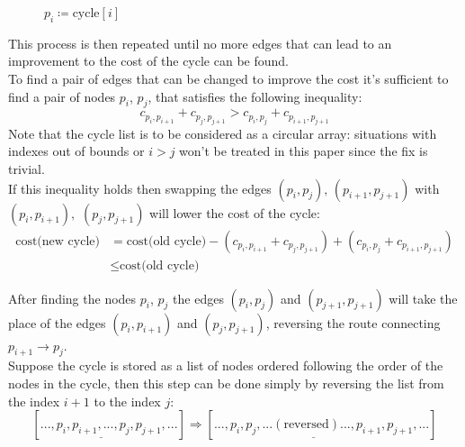 \begin{figure}[h]
\begin{subfigure}[c]{.4\textwidth}
{
        }
    \end{subfigure}
    \caption*{$p_i\coloneq\mbox{cycle}[i]$}

\end{figure}

This process is then repeated until no more edges that can lead to an improvement to the cost of the cycle can be found.\\
To find a pair of edges that can be changed to improve the cost it's sufficient to find a pair of nodes $p_i$, $p_j$, that satisfies the following inequality:
$$c_{p_i,p_{i+1}}+c_{p_j,p_{j+1}} > c_{p_i,p_{j}}+c_{p_{i+1},p_{j+1}}$$
Note that the cycle list is to be considered as a circular array: situations with indexes out of bounds or $i>j$ won't be treated in this paper since the fix is trivial.\\

If this inequality holds then swapping the edges $(p_i,p_j),\,(p_{i+1},p_{j+1})$ with $(p_i,p_{i+1}),$ $(p_{j},p_{j+1})$ will lower the cost of the cycle:
\begin{align*}
    \mbox{cost(new cycle)}&=\mbox{cost(old cycle)}-(c_{p_i,p_{i+1}}+c_{p_j,p_{j+1}})+(c_{p_i,p_{j}}+c_{p_{i+1},p_{j+1}})\\
    &\leq\mbox{cost(old cycle)}
\end{align*}

After finding the nodes $p_i$, $p_j$ the edges $(p_i, p_j)$ and $(p_{j+1}, p_{j+1})$ will take the place of the edges $(p_i, p_{i+1})$ and $(p_j, p_{j+1})$, reversing the route connecting $p_{i+1}\rightarrow p_{j}$.\\
Suppose the cycle is stored as a list of nodes ordered following the order of the nodes in the cycle, then this step can be done simply by reversing the list from the index $i+1$ to the index $j$:
$$[...,p_i,\underline{p_{i+1},...,p_j},p_{j+1},...]\Rightarrow[...,p_i,\underline{p_j,...(\mbox{reversed})...,p_{i+1}},p_{j+1},...]$$


